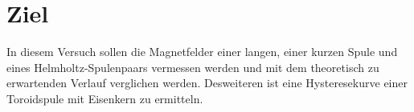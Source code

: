 \section{Ziel}
\label{sec:Ziel}
In diesem Versuch sollen die Magnetfelder einer langen, einer kurzen Spule und eines
Helmholtz-Spulenpaars vermessen werden und mit dem theoretisch zu erwartenden
Verlauf verglichen werden. Desweiteren ist eine Hysteresekurve einer Toroidspule
mit Eisenkern zu ermitteln.
